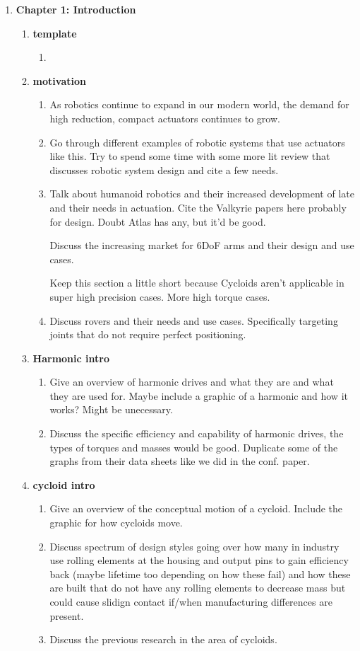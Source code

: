 \begin{enumerate}
	\item \textbf{Chapter 1: Introduction} 
	\begin{enumerate}
		\item \textbf{template}
		\begin{enumerate}
			\item
		\end{enumerate}
		\item \textbf{motivation}
		\begin{enumerate}
			\item
			As robotics continue to expand in our modern world, the demand for high reduction, compact actuators continues to grow. 
			\item
			Go through different examples of robotic systems that use actuators like this. Try to spend some time with some more lit review that discusses robotic system design and cite a few needs. 
			\item
			Talk about humanoid robotics and their increased development of late and their needs in actuation. Cite the Valkyrie papers here probably for design. Doubt Atlas has any, but it'd be good. 

			Discuss the increasing market for 6DoF arms and their design and use cases. 

			Keep this section a little short because Cycloids aren't applicable in super high precision cases. More high torque cases. 
			\item
			Discuss rovers and their needs and use cases. Specifically targeting joints that do not require perfect positioning. 
		\end{enumerate}

		\item \textbf{Harmonic intro}
		\begin{enumerate}
			\item
			Give an overview of harmonic drives and what they are and what they are used for. Maybe include a graphic of a harmonic and how it works? Might be unecessary. 
			\item
			Discuss the specific efficiency and capability of harmonic drives, the types of torques and masses would be good. Duplicate some of the graphs from their data sheets like we did in the conf. paper. 
		\end{enumerate}

		\item \textbf{cycloid intro}
		\begin{enumerate}
			\item
			Give an overview of the conceptual motion of a cycloid. Include the graphic for how cycloids move. 
			\item
			Discuss spectrum of design styles going over how many in industry use rolling elements at the housing and output pins to gain efficiency back (maybe lifetime too depending on how these fail) and how these are built that do not have any rolling elements to decrease mass but could cause slidign contact if/when manufacturing differences are present. 
			\item
			Discuss the previous research in the area of cycloids. 


\end{enumerate}
\end{enumerate}
\end{enumerate}

